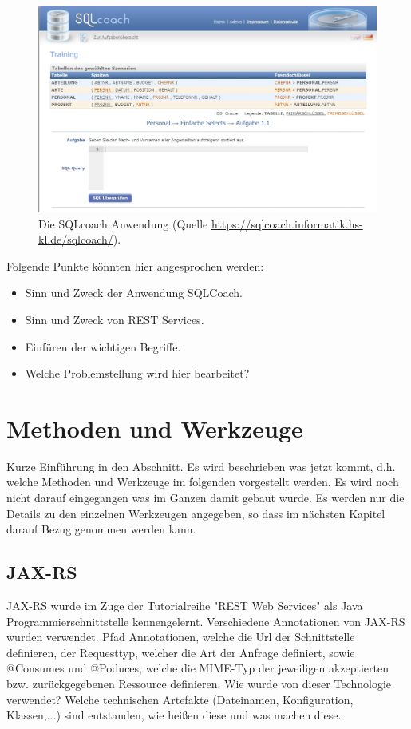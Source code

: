\documentclass[fleqn,10pt,ngerman]{SelfArx}
\begin{document}
	\begin{figure}[ht]\centering
		\includegraphics[width=5 cm]{Abbildungen/sqlcoach.jpg}
		\caption{Die SQLcoach Anwendung (Quelle \url{https://sqlcoach.informatik.hs-kl.de/sqlcoach/}).}
		\label{fig:fsm1}
	\end{figure}
	
	Folgende Punkte könnten hier angesprochen werden:
	\begin{itemize}[noitemsep]
		\item Sinn und Zweck der Anwendung SQLCoach.
		\item Sinn und Zweck von REST Services.
		\item Einf\"uren der wichtigen Begriffe.
		\item Welche Problemstellung wird hier bearbeitet?
	\end{itemize}
	
	
	
	
	
	
	
	
	
	
	
	\section{Methoden und Werkzeuge}
	\label{sec:methoden}
	Kurze Einführung in den Abschnitt. Es wird beschrieben was jetzt kommt, d.h. welche Methoden und Werkzeuge im folgenden vorgestellt werden. 
	Es wird noch nicht darauf eingegangen was im Ganzen damit gebaut wurde. Es werden nur die Details zu den einzelnen Werkzeugen angegeben, so dass im nächsten Kapitel darauf Bezug genommen werden kann. 
	
	
	\subsection{JAX-RS}
	JAX-RS wurde im Zuge der Tutorialreihe "REST Web Services" als Java Programmierschnittstelle kennengelernt.
	Verschiedene Annotationen von JAX-RS wurden verwendet. Pfad Annotationen, welche die Url der Schnittstelle definieren, der Requesttyp, welcher die Art der Anfrage definiert, sowie @Consumes und @Poduces, welche die MIME-Typ der jeweiligen akzeptierten bzw. zurückgegebenen Ressource definieren.
	Wie wurde von dieser Technologie verwendet?
	Welche technischen Artefakte (Dateinamen, Konfiguration, Klassen,...) sind entstanden, wie heißen diese und was machen diese. 
	
\end{document}
